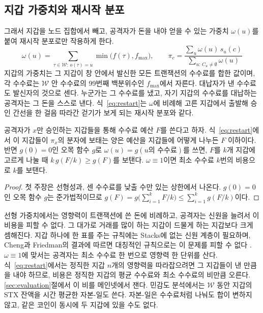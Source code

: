 \subsection{지갑 가중치와 재시작 분포}
\label{sec:method-weights}

그래서 지갑을 노드 집합에서 빼고, 공격자가 돈을 내야 얻을 수 있는 가중치 $\omega(u)$를 붙여 재시작 분포로만 작용하게 한다.
\begin{equation}
\label{eq:restart}
\omega(u)=\sum_{\tau\in\mathcal{W}:\,o(\tau)=u}\min\bigl(f(\tau),f_{\max}\bigr),
\qquad
\pi_c=\frac{\sum_{u}\omega(u)\,s_u(c)}{\sum_{u:\,C_u\neq\emptyset}\omega(u)}
\end{equation}
지갑의 가중치는 그 지갑이 창 안에서 발신한 모든 트랜잭션의 수수료를 합한 값이며, 각 수수료는 $\mathcal{W}$ 안 수수료의 99번째 백분위수인 $f_{\max}$에서 자른다. 대납자가 낸 수수료도 발신자의 것으로 센다. 누군가는 그 수수료를 냈고, 자기 지갑의 수수료를 대납하는 공격자는 그 돈을 스스로 낸다. 식~\eqref{eq:restart}는 $\omega$에 비례해 고른 지갑에서 출발해 승인 간선을 한 걸음 따라간 걷기가 보게 되는 재시작 분포와 같다.

\begin{proposition}
\label{prop:split}
공격자가 $x$만 승인하는 지갑들을 통해 수수료 예산 $F$를 쓴다고 하자. 식~\eqref{eq:restart}에서 이 지갑들이 $\pi_x$의 분자에 보태는 양은 예산을 지갑들에 어떻게 나누든 $F$ 이하이다. 반면 $g(0)=0$인 오목 함수 $g$로 $\omega(u)=g(u\text{의 수수료})$를 쓰면, $F$를 $k$개 지갑에 고르게 나눌 때 $k\,g(F/k)\geq g(F)$를 보탠다. $\omega\equiv 1$이면 최소 수수료 $k$번의 비용으로 $k$를 보탠다.
\end{proposition}

\begin{proof}
첫 주장은 선형성과, 센 수수료를 낮출 수만 있는 상한에서 나온다. $g(0)=0$인 오목 함수 $g$는 준가법적이므로 $g(F)=g\bigl(\sum_{i=1}^{k}F/k\bigr)\leq\sum_{i=1}^{k}g(F/k)$이다.
\end{proof}

선형 가중치에서는 영향력이 트랜잭션에 쓴 돈에 비례하고, 공격자는 신원을 늘려서 이 비용을 피할 수 없다. 그 대가로 거래를 많이 하는 지갑이 드물게 하는 지갑보다 크게 셈해진다. 지갑 하나에 한 표를 주는 규칙에는 Stacks에 없는 신원 계층이 필요하며, Cheng과 Friedman의 결과에 따르면 대칭적인 규칙으로는 이 문제를 피할 수 없다 \cite{cheng2005sybilproof}. $\omega\equiv1$에 맞서는 공격자는 최소 수수료 한 번으로 영향력 한 단위를 산다. 식~\eqref{eq:restart}에서는 정직한 지갑 $n$개의 영향력을 따라잡으려면 그 지갑들이 낸 만큼을 내야 하므로, 비용은 정직한 지갑의 평균 수수료와 최소 수수료의 비만큼 오른다. \ref{sec:evaluation}절에서 이 비를 메인넷에서 잰다. 민감도 분석에서는 $\mathcal{W}$ 동안 지갑의 STX 잔액을 시간 평균한 자본-일도 쓴다. 자본-일은 수수료처럼 나눠도 합이 변하지 않고, 같은 코인이 동시에 두 지갑에 있을 수도 없다.


